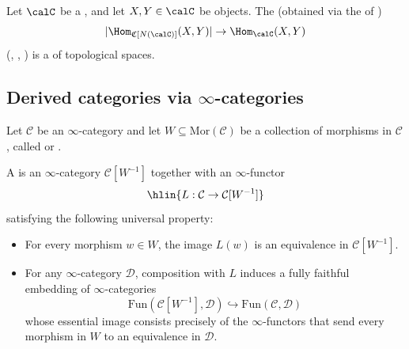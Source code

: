 







\begin{theorem}
    Let $\calC$ be a , and let $X,Y \in \calC$ be objects. The  (obtained via the  of )
    $$|\Hom_{\mathfrak{C}[N(\calC)]}(X,Y)| \to \Hom_{\calC}(X,Y) $$
    (, , )
    is a  of topological spaces.
\end{theorem}


\subsection{Derived categories via \texorpdfstring{$\infty$}{infinity}-categories}

\begin{definition}
    Let $\mathcal{C}$ be an $\infty$-category and let $W \subseteq \mathrm{Mor}(\mathcal{C})$ be a collection of morphisms in $\mathcal{C}$, called  or .

    A  is an $\infty$-category $\mathcal{C}[W^{-1}]$ together with an $\infty$-functor
    $$\hlin{L: \mathcal{C} \to \mathcal{C}[W^{-1}]}$$
    satisfying the following universal property:
    \begin{itemize}
        \item For every morphism $w \in W$, the image $L(w)$ is an equivalence in $\mathcal{C}[W^{-1}]$.
        \item For any $\infty$-category $\mathcal{D}$, composition with $L$ induces a fully faithful embedding of $\infty$-categories
        \[
        \mathrm{Fun}(\mathcal{C}[W^{-1}], \mathcal{D}) \hookrightarrow \mathrm{Fun}(\mathcal{C}, \mathcal{D})
        \]
        whose essential image consists precisely of the $\infty$-functors that send every morphism in $W$ to an equivalence in $\mathcal{D}$.
    \end{itemize}
\end{definition}



